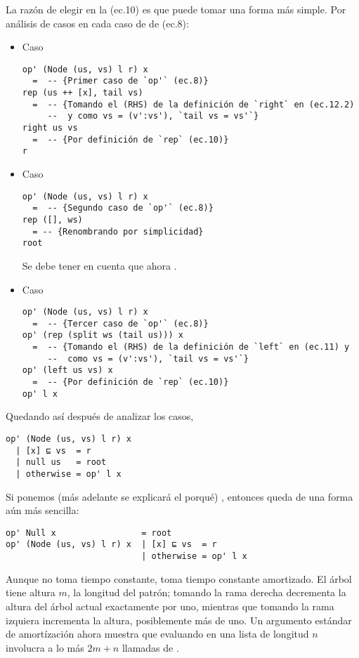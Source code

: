 La razón de elegir  en la (ec.10) es que  puede tomar una forma más simple.
Por análisis de casos en cada caso de  de (ec.8):

\begin{itemize}
\item Caso 
\begin{verbatim}
op' (Node (us, vs) l r) x
  =  -- {Primer caso de `op'` (ec.8)}
rep (us ++ [x], tail vs)
  =  -- {Tomando el (RHS) de la definición de `right` en (ec.12.2) 
     --  y como vs = (v':vs'), `tail vs = vs'`}
right us vs
  =  -- {Por definición de `rep` (ec.10)}
r
\end{verbatim}

\item Caso 
\begin{verbatim}
op' (Node (us, vs) l r) x
  =  -- {Segundo caso de `op'` (ec.8)}
rep ([], ws)
  = -- {Renombrando por simplicidad}
root
\end{verbatim}
Se debe tener en cuenta que ahora .

\item Caso 
\begin{verbatim}
op' (Node (us, vs) l r) x
  =  -- {Tercer caso de `op'` (ec.8)}
op' (rep (split ws (tail us))) x
  =  -- {Tomando el (RHS) de la definición de `left` en (ec.11) y 
     --  como vs = (v':vs'), `tail vs = vs'`}
op' (left us vs) x
  =  -- {Por definición de `rep` (ec.10)}
op' l x
\end{verbatim}
\end{itemize}

Quedando así después de analizar los casos,
\begin{verbatim}
op' (Node (us, vs) l r) x
  | [x] ⊑ vs  = r
  | null us   = root
  | otherwise = op' l x
\end{verbatim}

Si ponemos  (más adelante se explicará el porqué) %
, entonces  queda de una forma aún más sencilla:
\begin{verbatim}
op' Null x                 = root
op' (Node (us, vs) l r) x  | [x] ⊑ vs  = r
                           | otherwise = op' l x
\end{verbatim}

Aunque  no toma tiempo constante, toma tiempo constante amortizado. %
El árbol  tiene altura $m$, la longitud del patrón; tomando la rama derecha decrementa la altura del árbol actual exactamente por uno, %
mientras que tomando la rama izquiera incrementa la altura, posiblemente más de uno. %
Un argumento estándar de amortízación ahora muestra que evaluando  en una lista de longitud $n$ involucra a lo más $2m + n$ llamadas de . %

